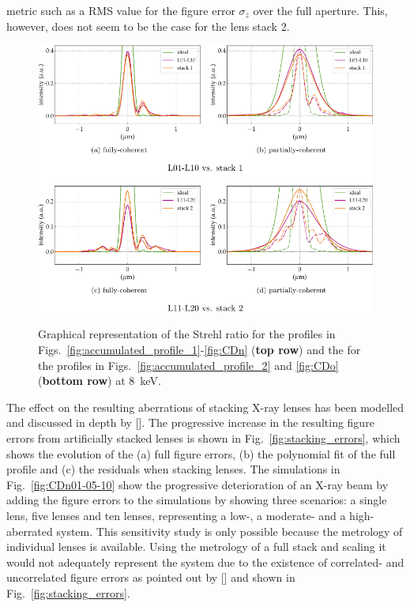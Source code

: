 \begin{refsection}
metric such as a RMS value for the figure error $\sigma_z$ over the full aperture. This, however, does not seem to be the case for the lens stack 2.

\begin{figure}[t]
    \centering
    {\includegraphics[width=0.75\linewidth]{figures/ch05/CD_Strehl.pdf}}
    \caption[Strehl ratio of L01-L10 vs. stack 1 and L11-L20 vs. stack 2 simulations]{Graphical representation of the Strehl ratio for the profiles in Figs.~\ref{fig:accumulated_profile_1}-\ref{fig:CDn} (\textbf{top row}) and the for the profiles in Figs.~\ref{fig:accumulated_profile_2} and \ref{fig:CDo} (\textbf{bottom row}) at 8~keV. }
    \label{fig:CD_Strehl}
\end{figure}

The effect on the resulting aberrations of stacking X-ray lenses has been modelled and discussed in depth by [\cite{Osterhoff2017}]. The progressive increase in the resulting figure errors from artificially stacked lenses is shown in Fig.~\ref{fig:stacking_errors}, which shows the evolution of the (a) full figure errors, (b) the polynomial fit of the full profile and (c) the residuals when stacking lenses. The simulations in Fig.~\ref{fig:CDn01-05-10} show the progressive deterioration of an X-ray beam by adding the figure errors to the simulations by showing three scenarios: a single lens, five lenses and ten lenses, representing a low-, a moderate- and a high-aberrated system. This sensitivity study is only possible because the metrology of individual lenses is available. Using the metrology of a full stack and scaling it would not adequately represent the system due to the existence of correlated- and uncorrelated figure errors as pointed out by [\cite{Osterhoff2017}] and shown in Fig.~\ref{fig:stacking_errors}.


\end{refsection}
